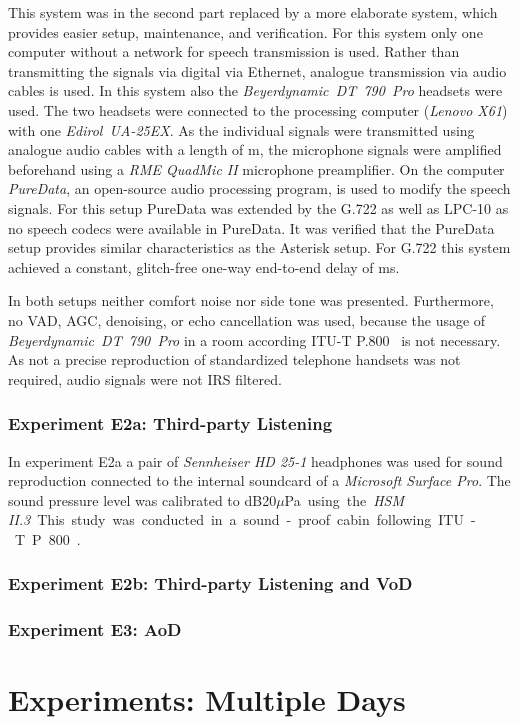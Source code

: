 This system was in the second part replaced by a more elaborate system, which provides easier setup, maintenance, and verification.
For this system only one computer without a network for speech transmission is used.
Rather than transmitting the signals via digital via Ethernet, analogue transmission via audio cables is used.
In this system also the \emph{Beyerdynamic~DT~790~Pro} headsets were used.
The two headsets were connected to the processing computer (\emph{Lenovo X61}) with one \emph{Edirol~UA-25EX}.
As the individual signals were transmitted using analogue audio cables with a length of \unit[10]{m}, the microphone signals were amplified beforehand using a \emph{RME QuadMic II} microphone preamplifier.
On the computer \emph{PureData}, an open-source audio processing program, is used to modify the speech signals.
For this setup PureData was extended by the G.722 as well as LPC-10 as no speech codecs were available in PureData.
It was verified that the PureData setup provides similar characteristics as the Asterisk setup.
For G.722 this system achieved a constant, glitch-free one-way end-to-end delay of \unit[70]{ms}.

In both setups neither comfort noise nor side tone was presented.
Furthermore, no \ac{VAD}, \ac{AGC}, denoising, or echo cancellation was used, because the usage of \emph{Beyerdynamic~DT~790~Pro} in a room according ITU-T P.800~\citep{itu-t_p.800:_1996} is not necessary.
As not a precise reproduction of standardized telephone handsets was not required, audio signals were not IRS filtered.

\subsubsection{Experiment E2a: Third-party Listening}
In experiment E2a a pair of \emph{Sennheiser HD 25-1} headphones was used for sound reproduction connected to the internal soundcard of a \emph{Microsoft Surface Pro}.
The sound pressure level was calibrated to \unit[75]{dB20$\mu$Pa} using the \emph{HSM II.3}.
This study was conducted in a sound-proof cabin following ITU-T P.800~\citep{itu-t_p.800:_1996}.

\subsubsection{Experiment E2b: Third-party Listening and \ac{VoD}}


\subsubsection{Experiment E3: \ac{AoD}}


\section{Experiments: Multiple Days}



